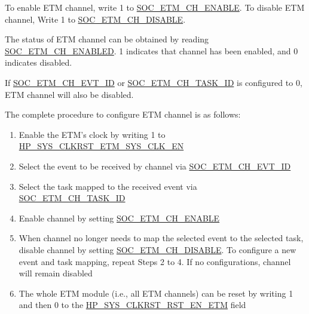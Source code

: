 \documentclass[main\_\_EN.tex]{subfiles}
\begin{document}
To enable ETM channel, write 1 to \hyperref[fielddesc:SOCETMCHENABLE0]{SOC\_ETM\_CH\_ENABLE}. To disable ETM channel, Write 1 to \hyperref[fielddesc:SOCETMCHDISABLE0]{SOC\_ETM\_CH\_DISABLE}.

The status of ETM channel can be obtained by reading \hyperref[fielddesc:SOCETMCHENABLED0]{SOC\_ETM\_CH\_ENABLED}. 1 indicates that channel has been enabled, and 0 indicates disabled.

If \hyperref[fielddesc:SOCETMCH0EVTID]{SOC\_ETM\_CH\_EVT\_ID}  or  \hyperref[fielddesc:SOCETMCH0TASKID]{SOC\_ETM\_CH\_TASK\_ID} is configured to 0, ETM channel will also be disabled.

The complete procedure to configure ETM channel is as follows:
\begin{enumerate}
    \item Enable the ETM's clock by writing 1 to \hyperref[fielddesc:HPSYSCLKRSTETMSYSCLKEN]{HP\_SYS\_CLKRST\_ETM\_SYS\_CLK\_EN}
    \item Select the event to be received by channel via \hyperref[fielddesc:SOCETMCH0EVTID]{SOC\_ETM\_CH\_EVT\_ID}
    \item Select the task mapped to the received event via  \hyperref[fielddesc:SOCETMCH0TASKID]{SOC\_ETM\_CH\_TASK\_ID}
    \item Enable channel by setting  \hyperref[fielddesc:SOCETMCHENABLE0]{SOC\_ETM\_CH\_ENABLE}
    \item When channel no longer needs to map the selected event to the selected task, disable channel by setting \hyperref[fielddesc:SOCETMCHDISABLE0]{SOC\_ETM\_CH\_DISABLE}. To configure a new event and task mapping, repeat Steps 2 to 4. If no configurations, channel will remain disabled
    \item The whole ETM module (i.e., all ETM channels) can be reset by writing 1 and then 0 to the \hyperref[fielddesc:HPSYSCLKRSTRSTENETM]{HP\_SYS\_CLKRST\_RST\_EN\_ETM} field
\end{enumerate}




\end{document}
